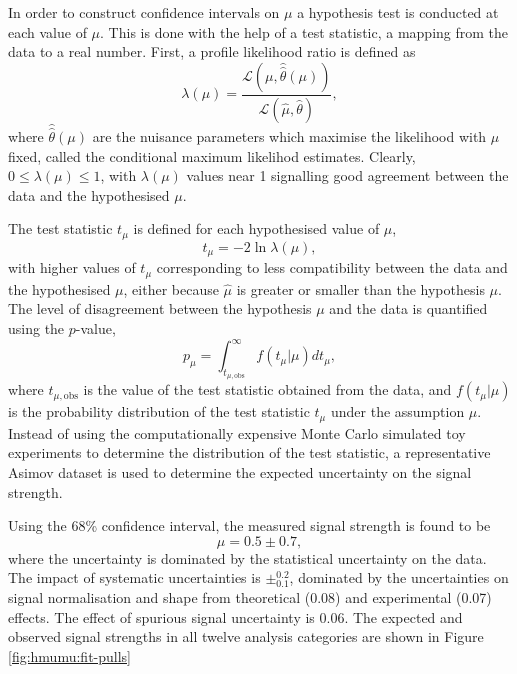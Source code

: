 In order to construct confidence intervals on $\mu$ a hypothesis
test is conducted at each value of $\mu$. This is done with the help
of a test statistic, a mapping from the data to a real number.
First, a profile likelihood ratio is defined as
\begin{equation}
\lambda(\mu) =
\frac{\mathcal{L}(\mu, \hat{\hat\theta}(\mu))}
     {\mathcal{L}(\hat\mu, \hat\theta)},
\end{equation}
where $\hat{\hat\theta}(\mu)$ are the nuisance parameters which maximise
the likelihood with $\mu$ fixed, called the conditional maximum
likelihod estimates. Clearly, $0 \leq \lambda(\mu) \leq 1$, with $\lambda(\mu)$
values near 1 signalling good agreement between the data and the
hypothesised $\mu$.

The test statistic $t_\mu$ is defined for each hypothesised value of
$\mu$,
\begin{equation}
t_\mu = -2\ln\lambda(\mu),
\end{equation}
with higher values of $t_\mu$ corresponding to less compatibility
between the data and the hypothesised $\mu$, either because
$\hat\mu$ is greater or smaller than the hypothesis $\mu$.
The level of disagreement between the hypothesis $\mu$ and the
data is quantified using the $p$-value,
\begin{equation}
p_\mu = \int_{t_{\mu, \text{obs}}}^{\infty} f(t_\mu|\mu) dt_\mu,
\end{equation}
where $t_{\mu, \text{obs}}$ is the value of the test statistic
obtained from the data, and $f(t_\mu|\mu)$ is the probability
distribution of the test statistic $t_\mu$ under the
assumption $\mu$. Instead of using the computationally expensive
Monte Carlo simulated toy experiments to determine the distribution
of the test statistic, a representative Asimov dataset \cite{Cowan:2010js} is
used to determine the expected uncertainty on the signal strength.

Using the 68\% confidence interval, the
measured signal strength is found to be
\begin{equation}
\mu = 0.5 \pm 0.7,
\end {equation}
where the uncertainty is dominated by the statistical uncertainty on the
data. The impact of systematic uncertainties is $\pm^{0.2}_{0.1}$,
dominated by the uncertainties on signal normalisation and shape
from theoretical (0.08) and experimental (0.07) effects. The effect
of spurious signal uncertainty is 0.06. The expected and observed signal
strengths in all twelve analysis categories are shown in Figure
\ref{fig:hmumu:fit-pulls}

